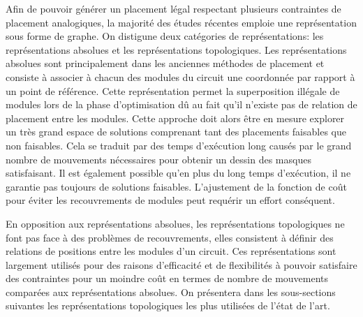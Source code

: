 Afin de pouvoir générer un placement légal respectant plusieurs contraintes de placement analogiques, la majorité des études récentes emploie une représentation sous forme de graphe. On distigune deux catégories de représentations: les représentations absolues et les représentations topologiques. Les représentations absolues \cite{Jepsen83} sont principalement dans les anciennes méthodes de placement et consiste à associer à chacun des modules du circuit une coordonnée par rapport à un point de référence. Cette représentation permet la superposition illégale de modules lors de la phase d'optimisation dû au fait qu'il n'existe pas de relation de placement entre les modules. Cette approche doit alors être en mesure explorer un très grand espace de solutions comprenant tant des placements faisables que non faisables. Cela se traduit par des temps d'exécution long causés par le grand nombre de mouvements nécessaires pour obtenir un dessin des masques satisfaisant. Il est également possible qu'en plus du long temps d'exécution, il ne garantie pas toujours de solutions faisables. L'ajustement de la fonction de coût pour éviter les recouvrements de modules peut requérir un effort conséquent. \newline

En opposition aux représentations absolues, les représentations topologiques ne font pas face à des problèmes de recouvrements, elles consistent à définir des relations de positions entre les modules d'un circuit. Ces représentations sont largement utilisés pour des raisons d'efficacité et de flexibilités à pouvoir satisfaire des contraintes pour un moindre coût en termes de nombre de mouvements comparées aux représentations absolues. On présentera dans les sous-sections suivantes les représentations topologiques les plus utilisées de l'état de l'art. 
